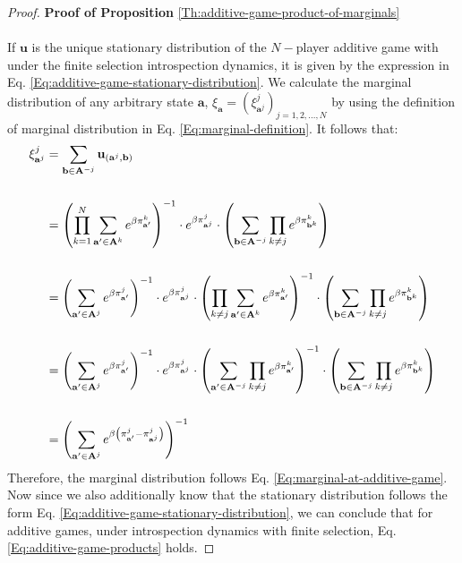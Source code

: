 \documentclass[11pt]{article}
\theoremstyle{plainCl1}
\theoremstyle{plainCl2}
\newcommand{\A}{\mathbf{A}}
\newcommand{\abf}{\mathbf{a}}
\newcommand{\ubf}{\mathbf{u}}
\begin{document}
\begin{proof}
\textbf{Proof of Proposition} \ref{Th:additive-game-product-of-marginals} \\ \\ 
If $\ubf$ is the unique stationary distribution of the $N-$player additive game with under the finite selection introspection dynamics, it is given by the expression in Eq. \ref{Eq:additive-game-stationary-distribution}. We calculate the marginal distribution of any arbitrary state $\abf$, $\xi_{\abf} = (\xi^j_{\abf^j})_{j = 1,2,...,N}$ by using the definition of marginal distribution in Eq. \ref{Eq:marginal-definition}. It follows that: 
\begin{align}
\xi^j_{\abf^j} &= \sum_{\mathbf{b} \in \A^{-j}} \ubf_{(\abf^j,\mathbf{b})} \\ \notag \\
&= \left( \prod_{k=1}^N \sum_{\abf' \in \A^k} \displaystyle e^{\beta \pi^k_{\abf'}}\right)^{-1} \cdot \displaystyle e^{\beta \pi^j_{\abf^j}} \cdot \left( \sum_{\mathbf{b} \in \A^{-j}} \prod_{k \neq j} e^{\beta \pi^k_{\mathbf{b}^k}} \right) \\ \notag \\
&= \left( \sum_{\abf' \in \A^j} \displaystyle e^{\beta \pi^j_{\abf'}}\right)^{-1} \cdot \displaystyle e^{\beta \pi^j_{\abf^j}} \cdot \left( \prod_{k\neq j} \sum_{\abf' \in \A^k} \displaystyle e^{\beta \pi^k_{\abf'}}\right)^{-1} \cdot \left( \sum_{\mathbf{b} \in \A^{-j}} \prod_{k \neq j} e^{\beta \pi^k_{\mathbf{b}^k}} \right) \\ \notag \\ 
&= \left( \sum_{\abf' \in \A^j} \displaystyle e^{\beta \pi^j_{\abf'}}\right)^{-1} \cdot \displaystyle e^{\beta \pi^j_{\abf^j}} \cdot \left( \sum_{\abf' \in \A^{-j}} \prod_{k\neq j}  \displaystyle e^{\beta \pi^k_{\abf'}}\right)^{-1} \cdot \left( \sum_{\mathbf{b} \in \A^{-j}} \prod_{k \neq j} e^{\beta \pi^k_{\mathbf{b}^k}} \right) \\ \notag \\ 
&= \left( \sum_{\abf' \in \A^j} \displaystyle e^{\beta \left( \pi^j_{\abf'} - \pi^j_{\abf^j}\right)}\right)^{-1}
\end{align}
\noindent Therefore, the marginal distribution follows Eq.  \ref{Eq:marginal-at-additive-game}. Now since we also additionally know that the stationary distribution follows the form Eq. \ref{Eq:additive-game-stationary-distribution}, we can conclude that for additive games, under introspection dynamics with finite selection, Eq. \ref{Eq:additive-game-products} holds. 
\end{proof}
\end{document}
